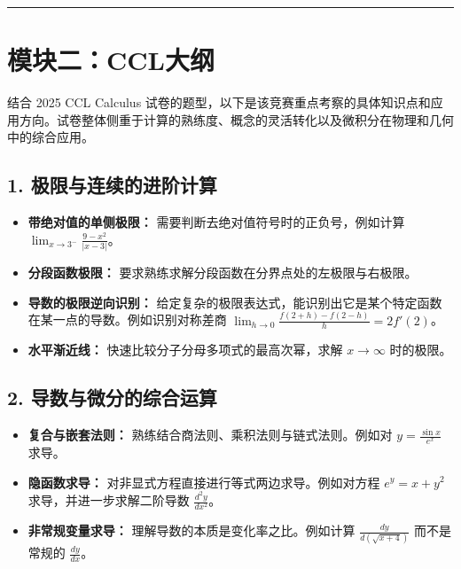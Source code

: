 \documentclass[12pt,a4paper]{article}
\begin{document}
\vspace{1em}
\hrule
\vspace{1em}

\section*{模块二：CCL大纲}
结合 2025 CCL Calculus 试卷的题型，以下是该竞赛重点考察的具体知识点和应用方向。试卷整体侧重于计算的熟练度、概念的灵活转化以及微积分在物理和几何中的综合应用。

\subsection*{1. 极限与连续的进阶计算}
\begin{itemize}
    \item \textbf{带绝对值的单侧极限：} 需要判断去绝对值符号时的正负号，例如计算 $\lim_{x \to 3^{-}} \frac{9-x^2}{|x-3|}$。
    \item \textbf{分段函数极限：} 要求熟练求解分段函数在分界点处的左极限与右极限。
    \item \textbf{导数的极限逆向识别：} 给定复杂的极限表达式，能识别出它是某个特定函数在某一点的导数。例如识别对称差商 $\lim_{h \to 0} \frac{f(2+h)-f(2-h)}{h} = 2f'(2)$。
    \item \textbf{水平渐近线：} 快速比较分子分母多项式的最高次幂，求解 $x \to \infty$ 时的极限。
\end{itemize}

\subsection*{2. 导数与微分的综合运算}
\begin{itemize}
    \item \textbf{复合与嵌套法则：} 熟练结合商法则、乘积法则与链式法则。例如对 $y = \frac{\sin x}{e^x}$ 求导。
    \item \textbf{隐函数求导：} 对非显式方程直接进行等式两边求导。例如对方程 $e^y = x+y^2$ 求导，并进一步求解二阶导数 $\frac{d^2y}{dx^2}$。
    \item \textbf{非常规变量求导：} 理解导数的本质是变化率之比。例如计算 $\frac{dy}{d(\sqrt{x+4})}$ 而不是常规的 $\frac{dy}{dx}$。
\end{itemize}
\end{document}
